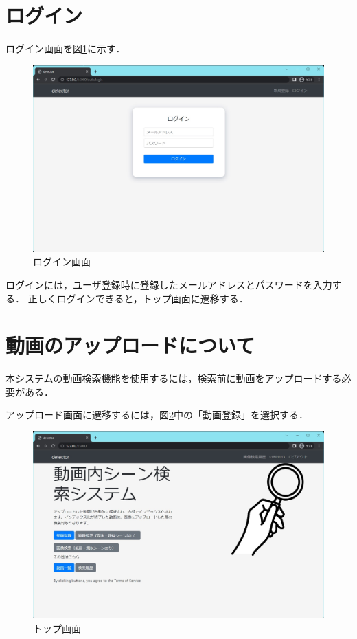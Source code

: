 \documentclass[a4j,12pt,dvipdfmx]{jreport}
\begin{document}
\section{ログイン}
ログイン画面を図\ref{fig:user_login}に示す．

\begin{figure}[H]
  \centering
  \includegraphics[width=13cm]{image/user_login.jpg}
  \caption{ログイン画面}
  \label{fig:user_login}
\end{figure}

ログインには，ユーザ登録時に登録したメールアドレスとパスワードを入力する．
正しくログインできると，トップ画面に遷移する．

\section{動画のアップロードについて}
本システムの動画検索機能を使用するには，検索前に動画をアップロードする必要がある．

アップロード画面に遷移するには，図\ref{fig:index}中の「動画登録」を選択する．

\begin{figure}[H]
  \centering
  \includegraphics[width=13cm]{image/index.jpg}
  \caption{トップ画面}
  \label{fig:index}
\end{figure}
\end{document}
